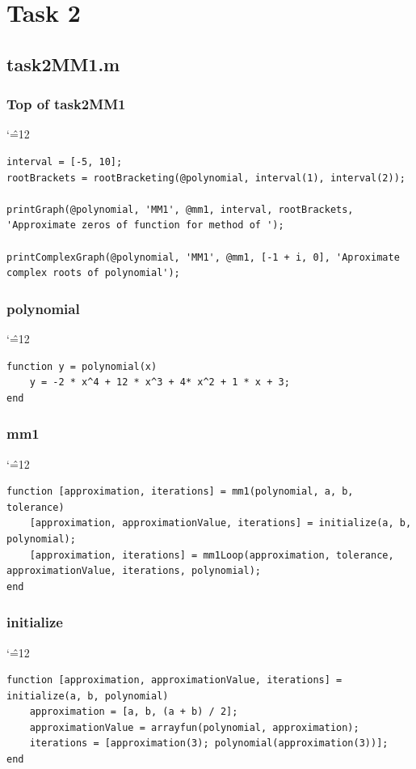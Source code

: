\documentclass[12pt]{report}
\newenvironment{simplechar}{%
   \catcode`\^=12
}{}
\begin{document}
\newpage
\section{Task 2}

\subsection{task2MM1.m}

\subsubsection{Top of task2MM1}
\begin{simplechar}
\begin{lstlisting}
interval = [-5, 10];
rootBrackets = rootBracketing(@polynomial, interval(1), interval(2));

printGraph(@polynomial, 'MM1', @mm1, interval, rootBrackets, 'Approximate zeros of function for method of ');

printComplexGraph(@polynomial, 'MM1', @mm1, [-1 + i, 0], 'Aproximate complex roots of polynomial');
\end{lstlisting}
\end{simplechar}

\subsubsection{polynomial}
\begin{simplechar}
\begin{lstlisting}
function y = polynomial(x)
    y = -2 * x^4 + 12 * x^3 + 4* x^2 + 1 * x + 3;
end
\end{lstlisting}
\end{simplechar}

\subsubsection{mm1}
\begin{simplechar}
\begin{lstlisting}
function [approximation, iterations] = mm1(polynomial, a, b, tolerance)
    [approximation, approximationValue, iterations] = initialize(a, b, polynomial);
    [approximation, iterations] = mm1Loop(approximation, tolerance, approximationValue, iterations, polynomial);
end
\end{lstlisting}
\end{simplechar}

\newpage
\subsubsection{initialize}
\begin{simplechar}
\begin{lstlisting}
function [approximation, approximationValue, iterations] = initialize(a, b, polynomial)
    approximation = [a, b, (a + b) / 2];
    approximationValue = arrayfun(polynomial, approximation);
    iterations = [approximation(3); polynomial(approximation(3))];
end
\end{lstlisting}
\end{simplechar}
\end{document}
